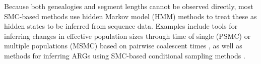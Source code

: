 \documentclass[11pt]{article}
\begin{document}
% 
% 
Because both genealogies and segment lengths cannot
be observed directly, most SMC-based methods use 
hidden Markov model (HMM) methods to treat these as hidden states to
be inferred from sequence data. 
Examples include tools for inferring changes in effective population 
sizes through time of single (PSMC) or multiple populations (MSMC) 
based on pairwise coalescent times \citep{li2011inference, schiffels_inferring_2014}, 
as well as methods for inferring ARGs using SMC-based conditional 
sampling methods
\citep[ARGweaver;][]{rasmussen2014genome, hubisz2020inference}.



\end{document}
